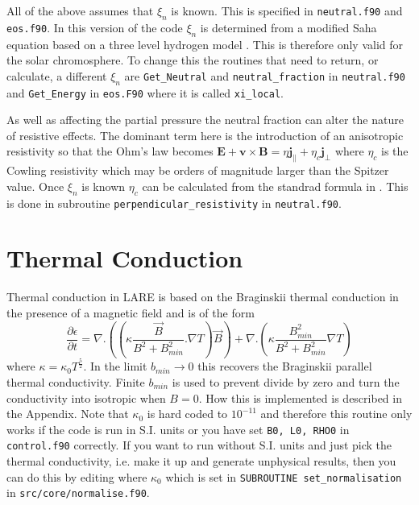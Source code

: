 \documentclass[11pt]{article}
\begin{document}
All of the above assumes that $\xi_n$ is known. This is specified in \texttt{neutral.f90} and \texttt{eos.f90}. In this version of the code $\xi_n$ is determined from a modified Saha equation based on a three level hydrogen model \cite{brown}. This is therefore only valid for the solar chromosphere. To change this the routines that need to return, or calculate, a different $\xi_n$ are \texttt{Get\_Neutral} and \texttt{neutral\_fraction} in \texttt{neutral.f90} and \texttt{Get\_Energy} in \texttt{eos.F90} where it is called \texttt{xi\_local}.

As well as affecting the partial pressure the neutral fraction can alter the nature of resistive effects. The dominant term here is the introduction of an anisotropic resistivity so that the Ohm's law becomes 
$\mathbf{E}+\mathbf{v}\times\mathbf{B}=\eta \mathbf{j_{\parallel}} + \eta_c \mathbf{j_{\perp}}$ 
where $\eta_c$ is the Cowling resistivity which may be orders of magnitude larger than the Spitzer value. Once $\xi_n$ is known $\eta_c$ can be calculated from the standrad formula in \cite{flux-emergence}. This is done in subroutine \texttt{perpendicular\_resistivity} in \texttt{neutral.f90}. 

\section{Thermal Conduction} %
\label{sec:thermal_conduction}
Thermal conduction in LARE is based on the Braginskii thermal conduction in the presence of a magnetic field and is of the form\\
\[
\frac{\partial \epsilon}{\partial t} = \nabla . \left(\left(\kappa \frac{\vec{B}}{B^2+B_{min}^2}. \nabla T\right) \vec{B} \right) +  \nabla . \left(\kappa  \frac{B_{min}^2}{B^2+B_{min}^2}  \nabla T \right)
\]
where $\kappa = \kappa_0  T^\frac{5}{2}$. In the limit $b_{min}\to 0$ this recovers the Braginskii parallel thermal conductivity. Finite $b_{min}$ is used to prevent divide by zero and turn the conductivity into isotropic when $B=0$.  How this is implemented is described in the Appendix. Note that $\kappa_0$ is hard coded to $10^{-11}$ and therefore this routine only works if the code is run in S.I. units or you have set {\tt B0, L0, RHO0} in {\tt control.f90} correctly. If you want to run without S.I. units and just pick the thermal conductivity, i.e. make it up and generate unphysical results, then you can do this by editing where $\kappa_0$ which is set in {\tt SUBROUTINE set\_normalisation} in {\tt src/core/normalise.f90}.    
\end{document}
